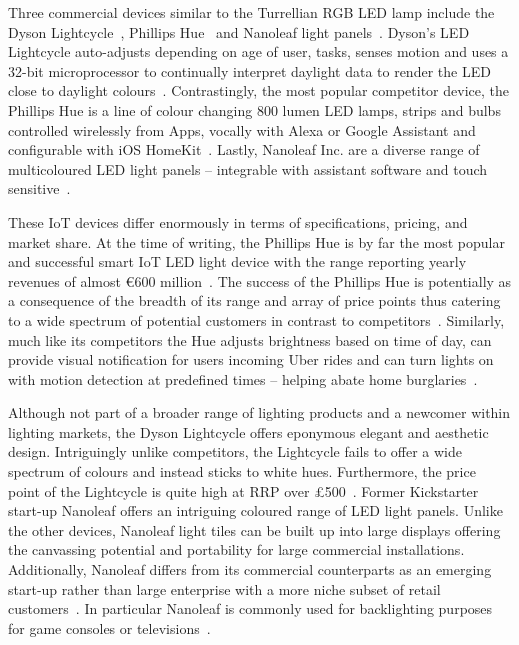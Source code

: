 \documentclass{sigchi}
\begin{document}
Three commercial devices similar to the Turrellian RGB LED lamp include the Dyson Lightcycle~\cite{Dyson01}, Phillips Hue~\cite{Phillips01} and Nanoleaf light panels~\cite{Nanoleaf01}. Dyson’s LED Lightcycle auto-adjusts depending on age of user, tasks, senses motion and uses a 32-bit microprocessor to continually interpret daylight data to render the LED close to daylight colours~\cite{Dyson01}. Contrastingly, the most popular competitor device, the Phillips Hue is a line of colour changing 800 lumen LED lamps, strips and bulbs controlled wirelessly from Apps, vocally with Alexa or Google Assistant and configurable with iOS HomeKit~\cite{Phillips01}. Lastly, Nanoleaf Inc. are a diverse range of multicoloured LED light panels – integrable with assistant software and touch sensitive~\cite{Nanoleaf01}. 

These IoT devices differ enormously in terms of specifications, pricing, and market share. At the time of writing, the Phillips Hue is by far the most popular and successful smart IoT LED light device with the range reporting yearly revenues of almost €600 million~\cite{}. The success of the Phillips Hue is potentially as a consequence of the breadth of its range and array of price points thus catering to a wide spectrum of potential customers in contrast to competitors~\cite{Phillips01}. Similarly, much like its competitors the Hue adjusts brightness based on time of day, can provide visual notification for users incoming Uber rides and can turn lights on with motion detection at predefined times – helping abate home burglaries~\cite{Phillips01}. 

Although not part of a broader range of lighting products and a newcomer within lighting markets, the Dyson Lightcycle offers eponymous elegant and aesthetic design. Intriguingly unlike competitors, the Lightcycle fails to offer a wide spectrum of colours and instead sticks to white hues. Furthermore, the price point of the Lightcycle is quite high at RRP over £500~\cite{Dyson01}. Former Kickstarter start-up Nanoleaf offers an intriguing coloured range of LED light panels. Unlike the other devices, Nanoleaf light tiles can be built up into large displays offering the canvassing potential and portability for large commercial installations. Additionally, Nanoleaf differs from its commercial counterparts as an emerging start-up rather than large enterprise with a more niche subset of retail customers~\cite{Nanoleaf01}. In particular Nanoleaf is commonly used for backlighting purposes for game consoles or televisions~\cite{Nanoleaf01}.
\end{document}
